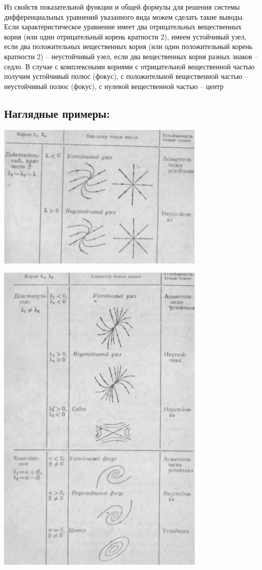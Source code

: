 \documentclass[12pt]{article}
\begin{document}
Из свойств показательной функции и общей формулы для решения системы дифференциальных
уравнений указанного вида можем сделать такие выводы.
Если характеристическое уравнение имеет два отрицательных вещественных корня (или один
отрицательный корень кратности 2), имеем устойчивый узел, если два положительных вещественных корня
(или один положительный корень кратности 2) – неустойчивый узел, если два вещественных корня разных
знаков – седло.
В случае с комплексными корнями с отрицательной вещественной частью получим устойчивый полюс
(фокус), с положительной вещественной частью – неустойчивый полюс (фокус), с нулевой вещественной
частью – центр

\subsection{Наглядные примеры:}

\includegraphics[width=100mm]{graphics/31_de_1.png}

\includegraphics[width=100mm]{graphics/31_de_2.png}
\end{document}
